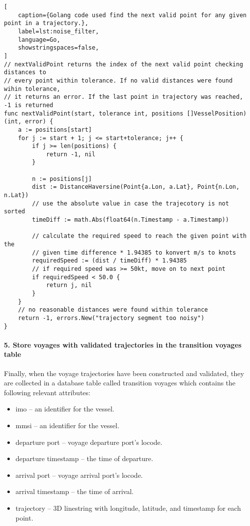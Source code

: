 \begin{lstlisting}[
    caption={Golang code used find the next valid point for any given point in a trajectory.},
    label=lst:noise_filter,
    language=Go,
    showstringspaces=false,
]
// nextValidPoint returns the index of the next valid point checking distances to
// every point within tolerance. If no valid distances were found wihin tolerance,
// it returns an error. If the last point in trajectory was reached, -1 is returned
func nextValidPoint(start, tolerance int, positions []VesselPosition) (int, error) {
	a := positions[start]
	for j := start + 1; j <= start+tolerance; j++ {
		if j >= len(positions) {
			return -1, nil
		}

		n := positions[j]
		dist := DistanceHaversine(Point{a.Lon, a.Lat}, Point{n.Lon, n.Lat})
		// use the absolute value in case the trajecotory is not sorted
		timeDiff := math.Abs(float64(n.Timestamp - a.Timestamp))

		// calculate the required speed to reach the given point with the
		// given time difference * 1.94385 to konvert m/s to knots
		requiredSpeed := (dist / timeDiff) * 1.94385
		// if required speed was >= 50kt, move on to next point
		if requiredSpeed < 50.0 {
			return j, nil
		}
	}
	// no reasonable distances were found within tolerance
	return -1, errors.New("trajectory segment too noisy")
}
\end{lstlisting}

\paragraph{5. Store voyages with validated trajectories in the transition voyages table}
Finally, when the voyage trajectories have been constructed and validated, they are collected in a database table called transition voyages which contains the following relevant attributes:

\begin{itemize}
    \item imo -- an identifier for the vessel.
    \item mmsi -- an identifier for the vessel.
    \item departure port -- voyage departure port's locode.
    \item departure timestamp -- the time of departure.
    \item arrival port -- voyage arrival port's locode.
    \item arrival timestamp -- the time of arrival.
    \item trajectory -- 3D linestring with longitude, latitude, and timestamp for each point.
\end{itemize}

